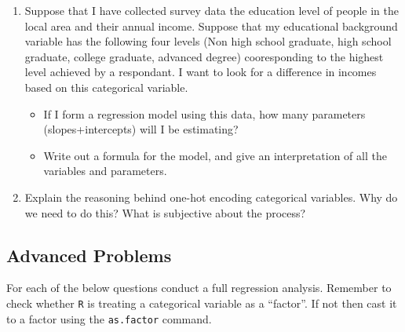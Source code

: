 \documentclass[
]{book}
\providecommand{\tightlist}{%
  \setlength{\itemsep}{0pt}\setlength{\parskip}{0pt}}
\theoremstyle{definition}
\theoremstyle{definition}
\theoremstyle{definition}
\theoremstyle{definition}
\theoremstyle{remark}
\begin{document}
\begin{enumerate}
\def\labelenumi{\arabic{enumi}.}
\item
  Suppose that I have collected survey data the education level of people in the local area and their annual income. Suppose that my educational background variable has the following four levels (Non high school graduate, high school graduate, college graduate, advanced degree) cooresponding to the highest level achieved by a respondant. I want to look for a difference in incomes based on this categorical variable.

  \begin{itemize}
  \tightlist
  \item
    If I form a regression model using this data, how many parameters (slopes+intercepts) will I be estimating?
  \item
    Write out a formula for the model, and give an interpretation of all the variables and parameters.
  \end{itemize}
\item
  Explain the reasoning behind one-hot encoding categorical variables. Why do we need to do this? What is subjective about the process?
\end{enumerate}

\hypertarget{advanced-problems-10}{%
\subsection{Advanced Problems}\label{advanced-problems-10}}

For each of the below questions conduct a full regression analysis. Remember to check whether \texttt{R} is treating a categorical variable as a ``factor''. If not then cast it to a factor using the \texttt{as.factor} command.
\end{document}
